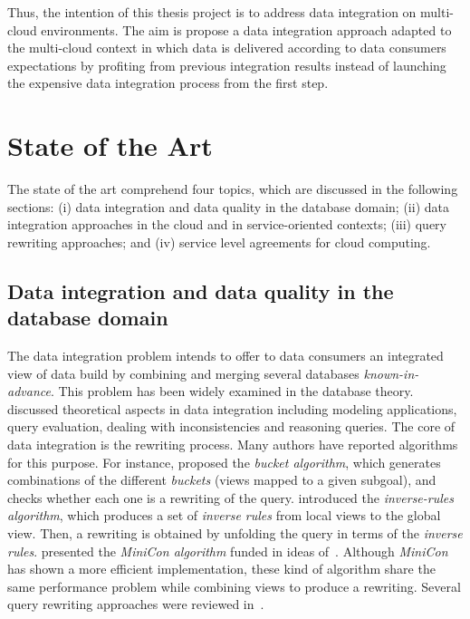%
Thus, the intention of this thesis project is to address data integration on multi-cloud 
environments.
%
The aim is propose a data integration approach adapted to the multi-cloud context in 
which data is delivered according to data consumers expectations by profiting from 
previous integration results instead of launching the expensive data integration 
process from the first step. 


\section{State of the Art}
%
The state of the art comprehend four topics, which are discussed in the following sections: 
(i) data integration and data quality in the database domain; 
(ii) data integration approaches in the cloud and in service-oriented contexts; 
(iii) query rewriting approaches; and 
(iv) service level agreements for cloud computing.

\subsection{Data integration and data quality in the database domain}
The data integration problem intends to offer to data consumers an integrated view of data 
build by combining and merging several databases \textit{known-in-advance}.  
This problem has been widely examined in the database theory.
\cite{Lenzerini:2002} discussed theoretical aspects in data integration including modeling 
applications, query evaluation, dealing with inconsistencies and reasoning queries.
The core of data integration is the rewriting process.
Many authors have reported algorithms for this purpose. 
For instance, \cite{Levy:1996} proposed the \textit{bucket algorithm}, which generates 
combinations of the different \textit{buckets} (views mapped to a given subgoal), and checks 
whether each one is a rewriting of the query. 
\cite{Duschka:1997} introduced the \textit{inverse-rules algorithm}, which produces a set of
\textit{inverse rules} from local views to the global view. Then, a rewriting is obtained by 
unfolding the query in terms of the \textit{inverse rules}. 
\cite{Pottinger:2001} presented the \textit{MiniCon algorithm} funded in ideas 
of~\cite{Duschka:1997}.
Although \textit{MiniCon} has shown a more efficient implementation, these kind of algorithm
share the same performance problem while combining views to produce a rewriting.
Several query rewriting approaches were reviewed in~\cite{Halevy:2001}.

